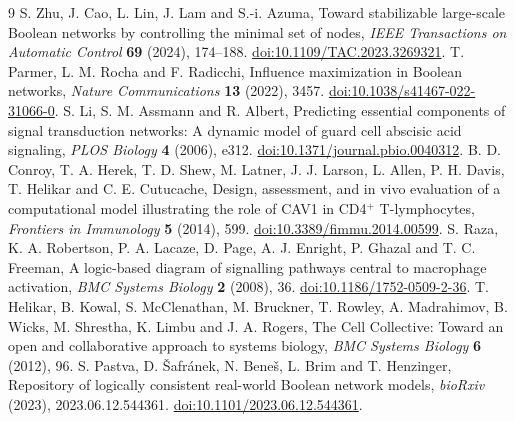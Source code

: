 \begin{thebibliography}{9}\small\setlength{\itemsep}{0pt}
 S. Zhu, J. Cao, L. Lin, J. Lam and S.-i. Azuma,
Toward stabilizable large-scale Boolean networks by controlling the minimal set of nodes,
\emph{IEEE Transactions on Automatic Control} \textbf{69} (2024), 174--188.
\href{https://doi.org/10.1109/TAC.2023.3269321}{doi:10.1109/TAC.2023.3269321}.
 T. Parmer, L. M. Rocha and F. Radicchi,
Influence maximization in Boolean networks,
\emph{Nature Communications} \textbf{13} (2022), 3457.
\href{https://doi.org/10.1038/s41467-022-31066-0}{doi:10.1038/s41467-022-31066-0}.
 S. Li, S. M. Assmann and R. Albert,
Predicting essential components of signal transduction networks: A dynamic model of guard cell abscisic acid signaling,
\emph{PLOS Biology} \textbf{4} (2006), e312.
\href{https://doi.org/10.1371/journal.pbio.0040312}{doi:10.1371/journal.pbio.0040312}.
 B. D. Conroy, T. A. Herek, T. D. Shew, M. Latner,
J. J. Larson, L. Allen, P. H. Davis, T. Helikar and C. E. Cutucache,
Design, assessment, and in vivo evaluation of a computational model
illustrating the role of CAV1 in CD4$^+$ T-lymphocytes,
\emph{Frontiers in Immunology} \textbf{5} (2014), 599.
\href{https://doi.org/10.3389/fimmu.2014.00599}{doi:10.3389/fimmu.2014.00599}.
 S. Raza, K. A. Robertson, P. A. Lacaze, D. Page,
A. J. Enright, P. Ghazal and T. C. Freeman,
A logic-based diagram of signalling pathways central to macrophage activation,
\emph{BMC Systems Biology} \textbf{2} (2008), 36.
\href{https://doi.org/10.1186/1752-0509-2-36}{doi:10.1186/1752-0509-2-36}.
 T. Helikar, B. Kowal, S. McClenathan, M. Bruckner,
T. Rowley, A. Madrahimov, B. Wicks, M. Shrestha, K. Limbu and J. A. Rogers,
The Cell Collective: Toward an open and collaborative approach to systems biology,
\emph{BMC Systems Biology} \textbf{6} (2012), 96.
 S. Pastva, D. \v{S}afr\'{a}nek, N. Bene\v{s}, L. Brim and T. Henzinger,
Repository of logically consistent real-world Boolean network models,
\emph{bioRxiv} (2023), 2023.06.12.544361.
\href{https://doi.org/10.1101/2023.06.12.544361}{doi:10.1101/2023.06.12.544361}.
\end{thebibliography}
